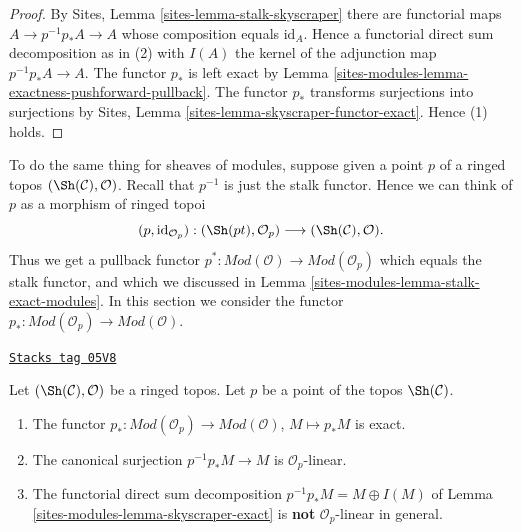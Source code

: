 \begin{proof}
By
Sites, Lemma \ref{sites-lemma-stalk-skyscraper}
there are functorial maps $A \to p^{-1}p_*A \to A$ whose composition
equals $\text{id}_A$. Hence a functorial direct sum decomposition
as in (2) with $I(A)$ the kernel of the adjunction map
$p^{-1}p_*A \to A$. The functor $p_*$ is left exact by
Lemma \ref{sites-modules-lemma-exactness-pushforward-pullback}.
The functor $p_*$ transforms surjections into surjections by
Sites, Lemma \ref{sites-lemma-skyscraper-functor-exact}.
Hence (1) holds.
\end{proof}

To do the same thing for sheaves of modules, suppose given a point
$p$ of a ringed topos $(\Sh(\mathcal{C}), \mathcal{O})$.
Recall that $p^{-1}$ is just the stalk functor.
Hence we can think of $p$ as a morphism of ringed topoi
$$
(p, \text{id}_{\mathcal{O}_p}) :
(\Sh(pt), \mathcal{O}_p)
\longrightarrow
(\Sh(\mathcal{C}), \mathcal{O}).
$$
Thus we get a pullback functor
$p^* : \textit{Mod}(\mathcal{O}) \to \textit{Mod}(\mathcal{O}_p)$
which equals the stalk functor, and which we discussed in
Lemma \ref{sites-modules-lemma-stalk-exact-modules}.
In this section we consider the functor
$p_* : \textit{Mod}(\mathcal{O}_p) \to \textit{Mod}(\mathcal{O})$.

\begin{lemma}
\label{sites-modules-lemma-skyscraper-modules-exact}
\href{https://stacks.math.columbia.edu/tag/05V8}{\texttt{Stacks tag 05V8}}

Let $(\Sh(\mathcal{C}), \mathcal{O})$ be a ringed topos.
Let $p$ be a point of the topos $\Sh(\mathcal{C})$.
\begin{enumerate}
\item The functor
$p_* : \textit{Mod}(\mathcal{O}_p) \to \textit{Mod}(\mathcal{O})$,
$M \mapsto p_*M$ is exact.
\item The canonical surjection $p^{-1}p_*M \to M$ is $\mathcal{O}_p$-linear.
\item The functorial direct sum decomposition
$p^{-1}p_*M = M \oplus I(M)$ of Lemma \ref{sites-modules-lemma-skyscraper-exact}
is {\bf not} $\mathcal{O}_p$-linear in general.
\end{enumerate}
\end{lemma}

